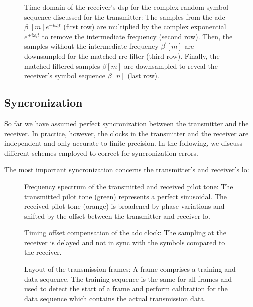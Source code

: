 \begin{figure}[htb]
	\centering
	
	\caption{Time domain of the receiver's \gls{dsp} for the complex random symbol sequence discussed for the transmitter: The samples from the \gls{adc} $\beta^\prime[m]e^{-i\omega_it}$ (first row) are multiplied by the complex exponential $e^{+i\omega_it}$ to remove the intermediate frequency (second row). Then, the samples without the intermediate frequency $\beta^\prime[m]$ are downsampled for the matched \gls{rrc} filter (third row). Finally, the matched filtered samples $\beta[m]$ are downsampled to reveal the receiver's symbol sequence $\beta[n]$ (last row).}
\end{figure}

\FloatBarrier
\subsection{Syncronization}


So far we have assumed perfect syncronization between the transmitter and the receiver.
In practice, however, the clocks in the transmitter and the receiver are independent and only accurate to finite precision.
In the following, we discuss different schemes employed to correct for syncronization errors.

The most important syncronization concerns the transmitter's and receiver's \gls{lo}:
\begin{figure}[htb]
	\centering
	
	\caption{Frequency spectrum of the transmitted and received pilot tone: The transmitted pilot tone (green) represents a perfect sinusoidal. The received pilot tone (orange) is broadened by phase variations and shifted by the offset between the transmitter and receiver \gls{lo}.}
\end{figure}
\begin{figure}[htb]
	\centering
	
	\caption{Timing offset compensation of the \gls{adc} clock: The sampling at the receiver is delayed and not in sync with the symbols compared to the receiver.}
\end{figure}

\begin{figure}[htb]
	\centering
	
	\caption{Layout of the transmission frames: A frame comprises a training and data sequence. The training sequence is the same for all frames and used to detect the start of a frame and perform calibration for the data sequence which contains the actual transmission data.}
\end{figure}
